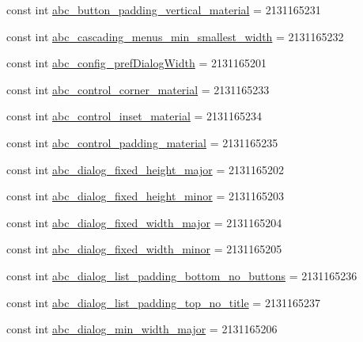 \begin{CompactItemize}
\item 
const int \hyperlink{class__2doo_1_1_droid_1_1_resource_1_1_dimension_ebbcb272b5c56a356b40414aec806abe}{abc\_\-button\_\-padding\_\-vertical\_\-material} = 2131165231
\item 
const int \hyperlink{class__2doo_1_1_droid_1_1_resource_1_1_dimension_3961e05d7342448d4ef35abd185c9e27}{abc\_\-cascading\_\-menus\_\-min\_\-smallest\_\-width} = 2131165232
\item 
const int \hyperlink{class__2doo_1_1_droid_1_1_resource_1_1_dimension_44a2162f76fcc7ca0ac77c10b8750027}{abc\_\-config\_\-prefDialogWidth} = 2131165201
\item 
const int \hyperlink{class__2doo_1_1_droid_1_1_resource_1_1_dimension_a7d17d3bdbfbe600b08d32c040a3da64}{abc\_\-control\_\-corner\_\-material} = 2131165233
\item 
const int \hyperlink{class__2doo_1_1_droid_1_1_resource_1_1_dimension_f4cbfe80df4f3b729ca95a21b22c7f1d}{abc\_\-control\_\-inset\_\-material} = 2131165234
\item 
const int \hyperlink{class__2doo_1_1_droid_1_1_resource_1_1_dimension_f552698c7ff310da1fd89bc3e9b20361}{abc\_\-control\_\-padding\_\-material} = 2131165235
\item 
const int \hyperlink{class__2doo_1_1_droid_1_1_resource_1_1_dimension_73d9a911b0553ef8505eca398d523820}{abc\_\-dialog\_\-fixed\_\-height\_\-major} = 2131165202
\item 
const int \hyperlink{class__2doo_1_1_droid_1_1_resource_1_1_dimension_a87ab5016a0265505923b39d94970087}{abc\_\-dialog\_\-fixed\_\-height\_\-minor} = 2131165203
\item 
const int \hyperlink{class__2doo_1_1_droid_1_1_resource_1_1_dimension_8d7b2cfc090fe169ca6d8ce490f838c7}{abc\_\-dialog\_\-fixed\_\-width\_\-major} = 2131165204
\item 
const int \hyperlink{class__2doo_1_1_droid_1_1_resource_1_1_dimension_3358d73566c90c2fa0f03ee834fd5058}{abc\_\-dialog\_\-fixed\_\-width\_\-minor} = 2131165205
\item 
const int \hyperlink{class__2doo_1_1_droid_1_1_resource_1_1_dimension_a755052007b7f0d42027d2b0b19c623f}{abc\_\-dialog\_\-list\_\-padding\_\-bottom\_\-no\_\-buttons} = 2131165236
\item 
const int \hyperlink{class__2doo_1_1_droid_1_1_resource_1_1_dimension_e32f44c7af9ed99d8eb53339573af04b}{abc\_\-dialog\_\-list\_\-padding\_\-top\_\-no\_\-title} = 2131165237
\item 
const int \hyperlink{class__2doo_1_1_droid_1_1_resource_1_1_dimension_ffd2f82cd4bcbf64b4d07e97c5f83f20}{abc\_\-dialog\_\-min\_\-width\_\-major} = 2131165206

\end{CompactItemize}
